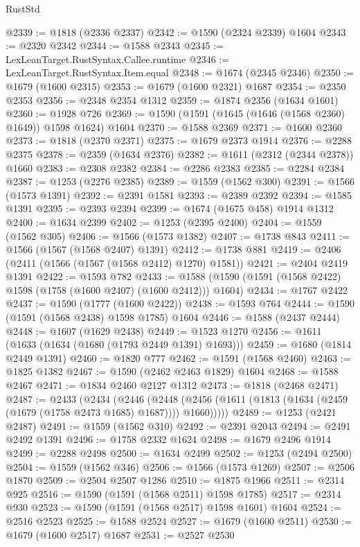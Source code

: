 \begin{lexlean}{RustStd}
\begin{coremodule}
@2339 := @1818 (@2336 @2337)
@2342 := @1590 (@2324 @2339) @1604
@2343 := @2320 @2342
@2344 := @1588 @2343
@2345 := LexLeanTarget.RustSyntax.Callee.runtime
@2346 := LexLeanTarget.RustSyntax.Item.equal
@2348 := @1674 (@2345 @2346)
@2350 := @1679 (@1600 @2315)
@2353 := @1679 (@1600 @2321) @1687
@2354 := @2350 @2353
@2356 := @2348 @2354 @1312
@2359 := @1874 @2356 (@1634 @1601)
@2360 := @1928 @726
@2369 := @1590 (@1591 (@1645 (@1646 (@1568 @2360) @1649)) @1598 @1624) @1604
@2370 := @1588 @2369
@2371 := @1600 @2360
@2373 := @1818 (@2370 @2371)
@2375 := @1679 @2373 @1914
@2376 := @2288 @2375
@2378 := @2359 (@1634 @2376)
@2382 := @1611 (@2312 (@2344 @2378)) @1660
@2383 := @2308 @2382
@2384 := @2286 @2383
@2385 := @2284 @2384
@2387 := @1253 (@2276 @2385)
@2389 := @1559 (@1562 @300)
@2391 := @1566 (@1573 @1391)
@2392 := @2391 @1581
@2393 := @2389 @2392
@2394 := @1585 @1391
@2395 := @2393 @2394
@2399 := @1674 (@1675 @458) @1914 @1312
@2400 := @1634 @2399
@2402 := @1253 (@2395 @2400)
@2404 := @1559 (@1562 @305)
@2406 := @1566 (@1573 @1382)
@2407 := @1738 @843
@2411 := @1566 (@1567 (@1568 @2407) @1391)
@2412 := @1738 @881
@2419 := @2406 (@2411 (@1566 (@1567 (@1568 @2412) @1270) @1581))
@2421 := @2404 @2419 @1391
@2422 := @1593 @782
@2433 := @1588 (@1590 (@1591 (@1568 @2422) @1598 (@1758 (@1600 @2407) (@1600 @2412))) @1604)
@2434 := @1767 @2422
@2437 := @1590 (@1777 (@1600 @2422))
@2438 := @1593 @764
@2444 := @1590 (@1591 (@1568 @2438) @1598 @1785) @1604
@2446 := @1588 (@2437 @2444)
@2448 := @1607 (@1629 @2438)
@2449 := @1523 @1270
@2456 := @1611 (@1633 (@1634 (@1680 (@1793 @2449 @1391) @1693)))
@2459 := @1680 (@1814 @2449 @1391)
@2460 := @1820 @777
@2462 := @1591 (@1568 @2460)
@2463 := @1825 @1382
@2467 := @1590 (@2462 @2463 @1829) @1604
@2468 := @1588 @2467
@2471 := @1834 @2460 @2127 @1312
@2473 := @1818 (@2468 @2471)
@2487 := @2433
    (@2434
      (@2446
        (@2448 (@2456 (@1611 (@1813 (@1634 (@2459 (@1679 (@1758 @2473 @1685) @1687)))) @1660)))))
@2489 := @1253 (@2421 @2487)
@2491 := @1559 (@1562 @310)
@2492 := @2391 @2043
@2494 := @2491 @2492 @1391
@2496 := @1758 @2332 @1624
@2498 := @1679 @2496 @1914
@2499 := @2288 @2498
@2500 := @1634 @2499
@2502 := @1253 (@2494 @2500)
@2504 := @1559 (@1562 @346)
@2506 := @1566 (@1573 @1269)
@2507 := @2506 @1870
@2509 := @2504 @2507 @1286
@2510 := @1875 @1966
@2511 := @2314 @925
@2516 := @1590 (@1591 (@1568 @2511) @1598 @1785)
@2517 := @2314 @930
@2523 := @1590 (@1591 (@1568 @2517) @1598 @1601) @1604
@2524 := @2516 @2523
@2525 := @1588 @2524
@2527 := @1679 (@1600 @2511)
@2530 := @1679 (@1600 @2517) @1687
@2531 := @2527 @2530

\end{coremodule}
\end{lexlean}
